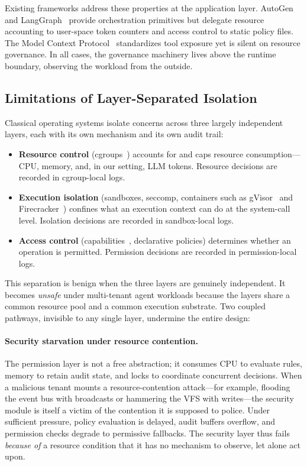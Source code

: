 Existing frameworks address these properties at the application layer.
AutoGen~\cite{wu2023autogen} and LangGraph~\cite{langgraph2024} provide
orchestration primitives but delegate resource accounting to user-space token
counters and access control to static policy files. The Model Context
Protocol~\cite{anthropic2024mcp} standardizes tool exposure yet is silent on
resource governance. In all cases, the governance machinery lives above the
runtime boundary, observing the workload from the outside.

\subsection{Limitations of Layer-Separated Isolation}
\label{sec:bg-lim}

Classical operating systems isolate concerns across three largely independent
layers, each with its own mechanism and its own audit trail:

\begin{itemize}
    \item \textbf{Resource control} (cgroups~\cite{linux2024cgroupv2}) accounts
    for and caps resource consumption---CPU, memory, and, in our setting, LLM
    tokens. Resource decisions are recorded in cgroup-local logs.
    \item \textbf{Execution isolation} (sandboxes, seccomp, containers such as
    gVisor~\cite{young2023gvisor} and Firecracker~\cite{agache2020firecracker})
    confines what an execution context can do at the system-call level.
    Isolation decisions are recorded in sandbox-local logs.
    \item \textbf{Access control} (capabilities~\cite{mercer2012capsicum,
    klein2009sel4}, declarative policies) determines whether an operation is
    permitted. Permission decisions are recorded in permission-local logs.
\end{itemize}

This separation is benign when the three layers are genuinely independent. It
becomes \emph{unsafe} under multi-tenant agent workloads because the layers
share a common resource pool and a common execution substrate. Two coupled
pathways, invisible to any single layer, undermine the entire design:

\paragraph{Security starvation under resource contention.}
The permission layer is not a free abstraction; it consumes CPU to evaluate
rules, memory to retain audit state, and locks to coordinate concurrent
decisions. When a malicious tenant mounts a resource-contention attack---for
example, flooding the event bus with broadcasts or hammering the VFS with
writes---the security module is itself a victim of the contention it is
supposed to police. Under sufficient pressure, policy evaluation is delayed,
audit buffers overflow, and permission checks degrade to permissive fallbacks.
The security layer thus fails \emph{because of} a resource condition that it
has no mechanism to observe, let alone act upon.

